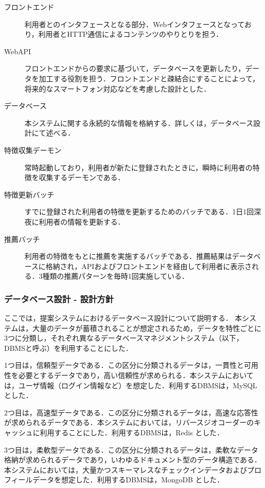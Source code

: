 \documentclass{jsarticle}
\begin{document}
\begin{description}
\item[フロントエンド] 利用者とのインタフェースとなる部分．Webインタフェースとなっており，利用者とHTTP通信によるコンテンツのやりとりを担う．
\item[WebAPI] フロントエンドからの要求に基づいて，データベースを更新したり，データを加工する役割を担う．フロントエンドと疎結合にすることによって，将来的なスマートフォン対応などを考慮した設計とした．
\item[データベース] 本システムに関する永続的な情報を格納する．詳しくは，データベース設計にて述べる．
\item[特徴収集デーモン] 常時起動しており，利用者が新たに登録されたときに，瞬時に利用者の特徴を収集するデーモンである．
\item[特徴更新バッチ] すでに登録された利用者の特徴を更新するためのバッチである．1日1回深夜に利用者の情報を更新する．
\item[推薦バッチ] 利用者の特徴をもとに推薦を実施するバッチである．推薦結果はデータベースに格納され，APIおよびフロントエンドを経由して利用者に表示される．3種類の推薦パターンを毎時1回実施している．
\end{description}


\subsubsection{データベース設計 - 設計方針}

ここでは，提案システムにおけるデータベース設計について説明する．
本システムは，大量のデータが蓄積されることが想定されるため，データを特性ごとに3つに分類し，それぞれ異なるデータベースマネジメントシステム（以下，DBMSと呼ぶ）を利用することにした．

1つ目は，信頼型データである．この区分に分類されるデータは，一貫性と可用性を必要とするデータであり，高い信頼性が求められる．本システムにおいては，ユーザ情報（ログイン情報など）を想定した．利用するDBMSは，MySQL とした．

2つ目は，高速型データである．この区分に分類されるデータは，高速な応答性が求められるデータである．本システムにおいては，リバースジオコーダーのキャッシュに利用することにした．利用するDBMSは，Redis とした．

3つ目は，柔軟型データである．この区分に分類されるデータは，柔軟なデータ格納が求められるデータであり，いわゆるドキュメント型のデータ構造である．本システムにおいては，大量かつスキーマレスなチェックインデータおよびプロフィールデータを想定した．利用するDBMSは，MongoDB とした．
\end{document}
